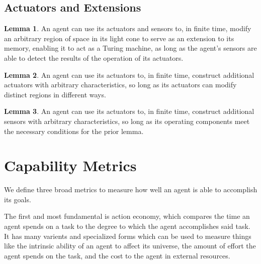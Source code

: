 \documentclass[12pt]{article}
\theoremstyle{definition}
\newtheorem{lem}{Lemma}
\begin{document}

\subsection{Actuators and Extensions}
\label{sec:action}

\begin{lem}

   An agent can use its actuators and sensors to, in finite time, modify an
   arbitrary region of space in its light cone to serve as an extension to its
   memory, enabling it to act as a Turing machine, as long as the agent's
   sensors are able to detect the results of the operation of its actuators.

\end{lem}

\begin{lem}

   An agent can use its actuators to, in finite time, construct additional
   actuators with arbitrary characteristics, so long as its actuators can
   modify distinct regions in different ways.

\end{lem}

\begin{lem}

   An agent can use its actuators to, in finite time, construct additional
   sensors with arbitrary characteristics, so long as its operating components
   meet the necessary conditions for the prior lemma.

\end{lem}

\section{Capability Metrics}
\label{sec:metrics}

We define three broad metrics to measure how well an agent is able to accomplish
its goals.

The first and most fundamental is action economy, which compares the time an
agent spends on a task to the degree to which the agent accomplishes said task.
It has many varients and specialized forms which can be used to measure things
like the intrinsic ability of an agent to affect its universe, the amount of
effort the agent spends on the task, and the cost to the agent in external
resources.
\end{document}
